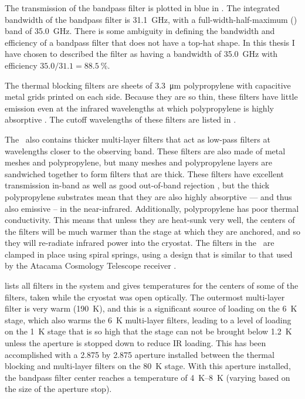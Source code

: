 The transmission of the bandpass filter is plotted in blue in .
The integrated bandwidth of the bandpass filter is \SI{31.1}{\GHz}, with a full-width-half-maximum (\FWHM) band of \SI{35.0}{\GHz}.
There is some ambiguity in defining the bandwidth and efficiency of a bandpass filter that does not have a top-hat shape.
In this thesis I have chosen to described the filter as having a bandwidth of \SI{35.0}{\GHz} with efficiency $35.0 / 31.1 = \SI{88.5}{\percent}$.

The thermal blocking filters are sheets of \SI{3.3}{\um} polypropylene with capacitive metal grids printed on each side.
Because they are so thin, these filters have little emission even at the infrared wavelengths at which polypropylene is highly absorptive \cite{tucker_thermal_2006}.
The cutoff wavelengths of these filters are listed in .

The \Imager\ also contains thicker multi-layer filters that act as low-pass filters at wavelengths closer to the observing band.
These filters are also made of metal meshes and polypropylene, but many meshes and polypropylene layers are sandwiched together to form filters that are  thick.
These filters have excellent transmission in-band as well as good out-of-band rejection \cite{ade_review_2006}, but the thick polypropylene substrates mean that they are also highly absorptive --- and thus also emissive -- in the near-infrared.
Additionally, polypropylene has poor thermal conductivity.
This means that unless they are heat-sunk very well, the centers of the filters will be much warmer than the stage at which they are anchored, and so they will re-radiate infrared power into the cryostat.
The filters in the \Imager\ are clamped in place using spiral springs, using a design that is similar to that used by the Atacama Cosmology Telescope receiver \cite{swetz_overview_2011}.

 lists all filters in the system and gives temperatures for the centers of some of the filters, taken while the cryostat was open optically.
The outermost multi-layer filter is very warm (\SI{190}{\K}), and this is a significant source of loading on the \SI{6}{\K} stage, which also warms the \SI{6}{\K} multi-layer filters, leading to a level of loading on the \SI{1}{\K} stage that is so high that the stage can not be brought below \SI{1.2}{\K} unless the aperture is stopped down to reduce IR loading.
This has been accomplished with a \SI{2.875}{\in} by \SI{2.875}{\in} aperture installed between the thermal blocking and multi-layer filters on the \SI{80}{\K} stage.
With this aperture installed, the bandpass filter center reaches a temperature of \SIrange{4}{8}{\K} (varying based on the size of the aperture stop).

